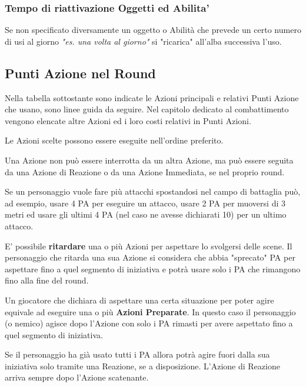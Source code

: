 \documentclass[12pt,a4paper,twoside,openany]{book}
\begin{document}
\begin{multicols}{2}
\subsubsection{Tempo di riattivazione Oggetti ed Abilita'}\label{temporiattivazioneoggetti}

Se non specificato diversamente un oggetto o Abilità che prevede un certo numero di usi al giorno \textit{"es. una volta al giorno"} si "ricarica" all'alba successiva l'uso.

\subsection{Punti Azione nel Round}\label{azioninelround}

Nella tabella sottostante sono indicate le Azioni principali e relativi Punti Azione che usano, sono linee guida da seguire. Nel capitolo dedicato al combattimento vengono elencate altre Azioni ed i loro costi relativi in Punti Azioni.

Le Azioni scelte possono essere eseguite nell'ordine preferito.

Una Azione non può essere interrotta da un altra Azione, ma può essere seguita da una Azione di Reazione o da una Azione Immediata, se nel proprio round.

Se un personaggio vuole fare più attacchi spostandosi nel campo di battaglia può, ad esempio, usare 4 PA per eseguire un attacco, usare 2 PA per muoversi di 3 metri ed usare gli ultimi 4 PA (nel caso ne avesse dichiarati 10) per un ultimo attacco.

E' possibile \textbf{ritardare} una o più Azioni per aspettare lo svolgersi delle scene. Il personaggio che ritarda una sua Azione si considera che abbia "sprecato" PA per aspettare fino a quel segmento di iniziativa e potrà usare solo i PA che rimangono fino alla fine del round.

Un giocatore che dichiara di aspettare una certa situazione per poter agire equivale ad eseguire una o più \textbf{Azioni Preparate}. In questo caso il personaggio (o nemico) agisce dopo l'Azione con solo i PA rimasti per avere aspettato fino a quel segmento di iniziativa.

Se il personaggio ha già usato tutti i PA allora potrà agire fuori dalla sua iniziativa solo tramite una Reazione, se a disposizione. L'Azione di Reazione arriva sempre dopo l'Azione scatenante.

\bigskip

\end{multicols}
\end{document}
